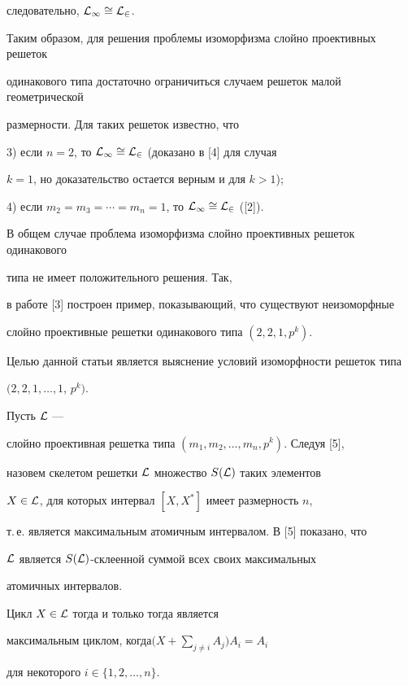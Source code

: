 следовательно, $\cal L_1 \cong \cal L_2$.





Таким образом, для решения проблемы изоморфизма слойно проективных решеток


одинакового типа достаточно ограничиться случаем решеток малой геометрической


размерности. Для таких решеток известно, что





3) если $n = 2$, то $\cal L_1 \cong \cal L_2$ (доказано в [4] для случая


$k = 1$, но доказательство остается верным и для $k>1$);





4) если $m_2=m_3=\dotsb=m_n=1$, то $\cal L_1 \cong \cal L_2$ ([2]).





В общем случае проблема изоморфизма слойно проективных решеток одинакового


типа не имеет положительного решения. Так,


в работе [3] построен пример, показывающий, что существуют неизоморфные


слойно проективные решетки одинакового типа $(2,2,1,p^k)$.





Целью данной статьи является выяснение условий изоморфности решеток типа


$(2,2,1,\dotsc,1$, $p^k)$.




Пусть $\cal L$ ---


слойно проективная решетка типа $(m_1,m_2,\dotsc,m_n,p^k)$. Следуя [5],


назовем скелетом решетки $\cal L$ множество $S(\cal L)$ таких элементов


$X \in \cal L$, для которых интервал $[X,X^*]$ имеет размерность $n$,


т.\,е. является максимальным атомичным интервалом. В [5] показано, что


$\cal L$ является $S(\cal L)$-склеенной суммой всех своих максимальных


атомичных интервалов.





\begin{lem}


Цикл $X \in \cal L$ тогда и только тогда является


максимальным циклом, когда\linebreak $\Big(X+\sum\limits_{j \ne i}A_j\Big)


A_i = A_i$


для некоторого $i \in \{1,2,\dotsc,n\}$.


\end{lem}





